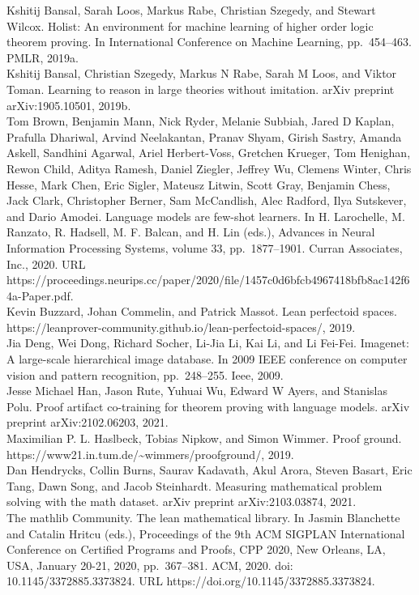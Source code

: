 \documentclass[
]{article}
\begin{document}
Kshitij Bansal, Sarah Loos, Markus Rabe, Christian Szegedy, and Stewart
Wilcox. Holist: An environment for machine learning of higher order
logic theorem proving. In International Conference on Machine Learning,
pp.~454--463. PMLR, 2019a.\\
Kshitij Bansal, Christian Szegedy, Markus N Rabe, Sarah M Loos, and
Viktor Toman. Learning to reason in large theories without imitation.
arXiv preprint arXiv:1905.10501, 2019b.\\
Tom Brown, Benjamin Mann, Nick Ryder, Melanie Subbiah, Jared D Kaplan,
Prafulla Dhariwal, Arvind Neelakantan, Pranav Shyam, Girish Sastry,
Amanda Askell, Sandhini Agarwal, Ariel Herbert-Voss, Gretchen Krueger,
Tom Henighan, Rewon Child, Aditya Ramesh, Daniel Ziegler, Jeffrey Wu,
Clemens Winter, Chris Hesse, Mark Chen, Eric Sigler, Mateusz Litwin,
Scott Gray, Benjamin Chess, Jack Clark, Christopher Berner, Sam
McCandlish, Alec Radford, Ilya Sutskever, and Dario Amodei. Language
models are few-shot learners. In H. Larochelle, M. Ranzato, R. Hadsell,
M. F. Balcan, and H. Lin (eds.), Advances in Neural Information
Processing Systems, volume 33, pp.~1877--1901. Curran Associates, Inc.,
2020. URL
https://proceedings.neurips.cc/paper/2020/file/1457c0d6bfcb4967418bfb8ac142f64a-Paper.pdf.\\
Kevin Buzzard, Johan Commelin, and Patrick Massot. Lean perfectoid
spaces. https://leanprover-community.github.io/lean-perfectoid-spaces/,
2019.\\
Jia Deng, Wei Dong, Richard Socher, Li-Jia Li, Kai Li, and Li Fei-Fei.
Imagenet: A large-scale hierarchical image database. In 2009 IEEE
conference on computer vision and pattern recognition, pp.~248--255.
Ieee, 2009.\\
Jesse Michael Han, Jason Rute, Yuhuai Wu, Edward W Ayers, and Stanislas
Polu. Proof artifact co-training for theorem proving with language
models. arXiv preprint arXiv:2102.06203, 2021.\\
Maximilian P. L. Haslbeck, Tobias Nipkow, and Simon Wimmer. Proof
ground. https://www21.in.tum.de/\textasciitilde wimmers/proofground/,
2019.\\
Dan Hendrycks, Collin Burns, Saurav Kadavath, Akul Arora, Steven Basart,
Eric Tang, Dawn Song, and Jacob Steinhardt. Measuring mathematical
problem solving with the math dataset. arXiv preprint arXiv:2103.03874,
2021.\\
The mathlib Community. The lean mathematical library. In Jasmin
Blanchette and Catalin Hritcu (eds.), Proceedings of the 9th ACM SIGPLAN
International Conference on Certified Programs and Proofs, CPP 2020, New
Orleans, LA, USA, January 20-21, 2020, pp.~367--381. ACM, 2020. doi:
10.1145/3372885.3373824. URL https://doi.org/10.1145/3372885.3373824.
\end{document}
